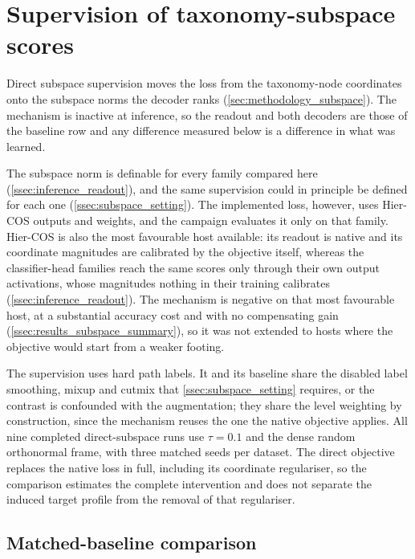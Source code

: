 \section{Supervision of taxonomy-subspace scores}
\label{sec:results_subspace}

Direct subspace supervision moves the loss from the taxonomy-node coordinates
onto the subspace norms the decoder ranks (\cref{sec:methodology_subspace}). The
mechanism is inactive at inference, so the readout and both decoders are those of
the baseline row and any difference measured below is a difference in what was
learned.

The subspace norm is definable for every family compared here
(\cref{ssec:inference_readout}), and the same supervision could in principle be
defined for each one (\cref{ssec:subspace_setting}). The implemented loss,
however, uses Hier-COS outputs and weights, and the campaign evaluates it only on
that family. Hier-COS is also the most favourable host available: its readout is
native and its coordinate magnitudes are calibrated by the objective itself,
whereas the classifier-head families reach the same scores only through their
own output activations, whose magnitudes nothing in their training calibrates
(\cref{ssec:inference_readout}). The mechanism is negative on that most favourable
host, at a substantial accuracy cost and with no compensating gain
(\cref{ssec:results_subspace_summary}), so it was not extended to hosts where
the objective would start from a weaker footing.

The supervision uses hard path labels. It and its baseline share the disabled
label smoothing, mixup and cutmix that \cref{ssec:subspace_setting} requires, or
the contrast is confounded with the augmentation; they share the level weighting
by construction, since the mechanism reuses the one the native objective
applies. All nine completed
direct-subspace runs use $\tau=0.1$ and the dense random orthonormal frame, with
three matched seeds per dataset. The direct objective replaces the native loss
in full, including its coordinate regulariser, so the comparison estimates the
complete intervention and does not separate the induced target profile from the
removal of that regulariser.

\subsection{Matched-baseline comparison}
\label{ssec:results_subspace_main}

